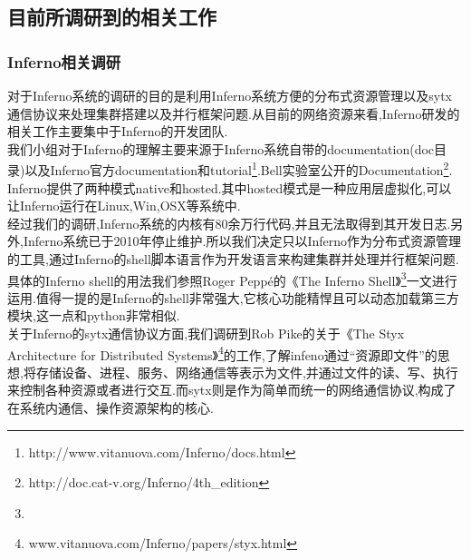 \documentclass[paper=a4]{ctexart} %
\numberwithin{equation}{section} %
\numberwithin{figure}{section} %
\numberwithin{table}{section} %
\newcommand{\n}{\\\indent}
\begin{document}
\subsection{目前所调研到的相关工作}

\subsubsection{Inferno相关调研}
对于Inferno系统的调研的目的是利用Inferno系统方便的分布式资源管理以及sytx通信协议来处理集群搭建以及并行框架问题.从目前的网络资源来看,Inferno研发的相关工作主要集中于Inferno的开发团队.\n
我们小组对于Inferno的理解主要来源于Inferno系统自带的documentation(doc目录)以及Inferno官方documentation和tutorial\footnote{http://www.vitanuova.com/Inferno/docs.html}.Bell实验室公开的Documentation\footnote{http://doc.cat-v.org/Inferno/4th\_edition}.\n
Inferno提供了两种模式native和hosted.其中hosted模式是一种应用层虚拟化,可以让Inferno运行在Linux,Win,OSX等系统中.\n
经过我们的调研,Inferno系统的内核有80余万行代码,并且无法取得到其开发日志.另外,Inferno系统已于2010年停止维护.所以我们决定只以Inferno作为分布式资源管理的工具,通过Inferno的shell脚本语言作为开发语言来构建集群并处理并行框架问题.具体的Inferno shell的用法我们参照Roger Peppé的《The Inferno Shell》\footnote{}一文进行运用.值得一提的是Inferno的shell非常强大,它核心功能精悍且可以动态加载第三方模块,这一点和python非常相似.\n
关于Inferno的sytx通信协议方面,我们调研到Rob Pike的关于《The Styx Architecture for Distributed Systems》\footnote{www.vitanuova.com/Inferno/papers/styx.html}的工作,了解infeno通过“资源即文件”的思想,将存储设备、进程、服务、网络通信等表示为文件,并通过文件的读、写、执行来控制各种资源或者进行交互.而sytx则是作为简单而统一的网络通信协议,构成了在系统内通信、操作资源架构的核心. 
\end{document}
